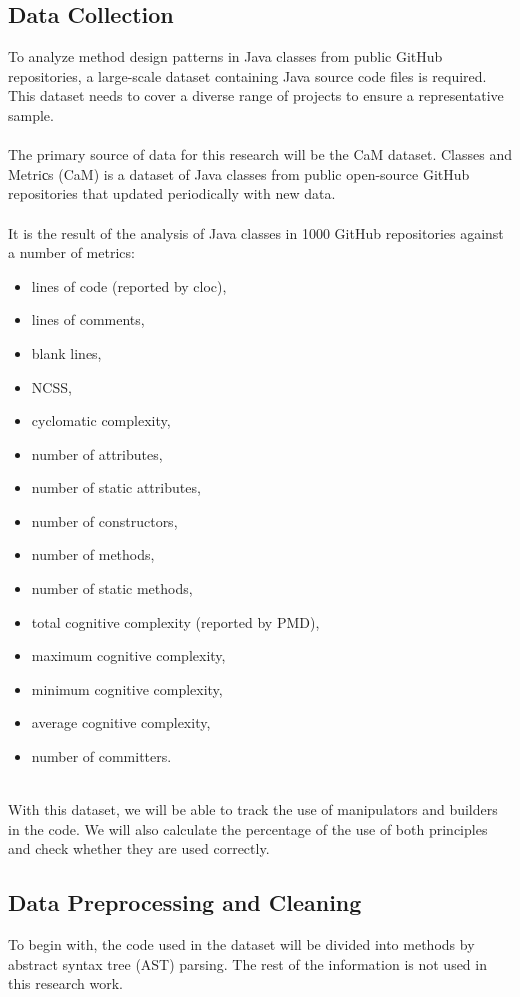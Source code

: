 \documentclass[draft]{article}
\begin{document}
\subsection{Data Collection}
To analyze method design patterns in Java classes from public GitHub repositories, a large-scale dataset containing Java source code files is required. This dataset needs to cover a diverse range of projects to ensure a representative sample.\\
~\\
The primary source of data for this research will be the CaM dataset. Classes and Metriсs (CaM) is a dataset of Java classes from public open-source GitHub repositories that updated periodically with new data.\\
~\\
It is the result of the analysis of Java classes in 1000 GitHub repositories against a number of metrics:
\begin{itemize}
\item lines of code (reported by cloc),
\item lines of comments,
\item blank lines,
\item NCSS,
\item cyclomatic complexity,
\item number of attributes,
\item number of static attributes,
\item number of constructors,
\item number of methods,
\item number of static methods,
\item total cognitive complexity (reported by PMD),
\item maximum cognitive complexity,
\item minimum cognitive complexity,
\item average cognitive complexity,
\item number of committers.
\end{itemize}
~\\
With this dataset, we will be able to track the use of manipulators and builders in the code. We will also calculate the percentage of the use of both principles and check whether they are used correctly.\\
\subsection{Data Preprocessing and Cleaning}
To begin with, the code used in the dataset will be divided into methods by abstract syntax tree (AST) parsing. The rest of the information is not used in this research work.\\
\end{document}
